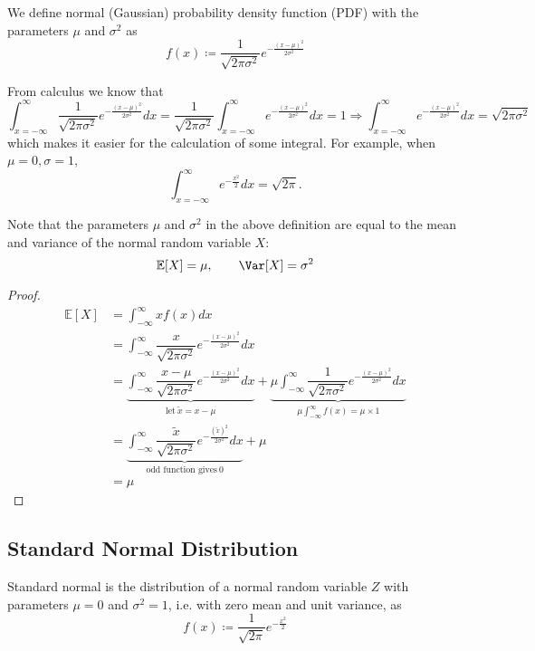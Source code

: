 \begin{definition}
    We define normal (Gaussian) probability density function (PDF) with the parameters \(\mu\) and \(\sigma^2\) as 
    \[
        f(x) \coloneqq \dfrac{1}{\sqrt{2\pi \sigma ^2}}e^{-\frac{(x - \mu)^2}{2\sigma^2}}
    \]
\end{definition}
\begin{remark}
    From calculus we know that 
    \[
        \int_{x = -\infty}^{\infty} \dfrac{1}{\sqrt{2\pi \sigma ^2}}e^{-\frac{(x - \mu)^2}{2\sigma^2}} dx = \dfrac{1}{\sqrt{2\pi \sigma ^2}}\int_{x = -\infty}^{\infty} e^{-\frac{(x - \mu)^2}{2\sigma^2}} dx = 1 \Longrightarrow \int_{x = -\infty}^{\infty} e^{-\frac{(x - \mu)^2}{2\sigma^2}} dx = \sqrt{2\pi \sigma ^2}
    \]
    which makes it easier for the calculation of some integral. For example, when \(\mu =0, \sigma =1\),
    \[
        \int_{x = -\infty}^{\infty} e^{-\frac{x^2}{2}}dx = \sqrt{2\pi}. 
    \] 
\end{remark}

Note that the parameters \(\mu\) and \(\sigma^2\) in the above definition are equal to the mean and variance of the normal random variable \(X\): 
\[
    \mathbb{E}[X] = \mu, \quad\quad \Var[X] = \sigma^2
\]
\begin{proof}
    \[
    \begin{aligned}
        \mathbb{E}[X] &= \int_{-\infty}^{\infty} xf(x) dx \\
        &= \int_{-\infty}^{\infty} \dfrac{x}{\sqrt{2\pi \sigma ^2}}e^{-\frac{(x - \mu)^2}{2\sigma^2}} dx \\
        &= \underbrace{\int_{-\infty}^{\infty} \dfrac{x - \mu}{\sqrt{2\pi \sigma ^2}}e^{-\frac{(x - \mu)^2}{2\sigma^2}} dx}_{\text{let}\ \tilde{x} = x - \mu} + \underbrace{\mu\int_{-\infty}^{\infty} \dfrac{1}{\sqrt{2\pi \sigma ^2}}e^{-\frac{(x - \mu)^2}{2\sigma^2}} dx}_{\mu\int_{-\infty}^{\infty} f(x) = \mu \times 1} \\
        &= \underbrace{\int_{-\infty}^{\infty} \dfrac{\tilde{x}}{\sqrt{2\pi \sigma ^2}}e^{-\frac{(\tilde{x})^2}{2\sigma^2}} dx}_{\text{odd function gives}\ 0} + \mu \\
        &= \mu 
    \end{aligned}
    \]
\end{proof}

\subsection{Standard Normal Distribution}
Standard normal is the distribution of a normal random variable \(Z\) with parameters \(\mu = 0\) and \(\sigma^2 = 1\), i.e. with zero mean and unit variance, as 
\[
    f(x) \coloneqq \dfrac{1}{\sqrt{2\pi}} e^{-\frac{x^2}{2}}
\]

